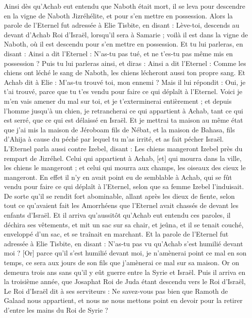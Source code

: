 \begin{multicols}{2}
Ainsi dès qu'Achab eut entendu que Naboth était mort, il se leva pour descendre en la vigne de Naboth Jizréhélite, et pour s'en mettre en possession.
Alors la parole de l'Eternel fut adressée à Elie Tisbite, en disant :
Lève-toi, descends au devant d'Achab Roi d'Israël, lorsqu'il sera à Samarie ; voilà il est dans la vigne de Naboth, où il est descendu pour s'en mettre en possession.
Et tu lui parleras, en disant : Ainsi a dit l'Eternel : N'as-tu pas tué, et ne t'es-tu pas même mis en possession ? Puis tu lui parleras ainsi, et diras : Ainsi a dit l'Eternel : Comme les chiens ont léché le sang de Naboth, les chiens lécheront aussi ton propre sang.
Et Achab dit à Elie : M'as-tu trouvé toi, mon ennemi ? Mais il lui répondit : Oui, je t'ai trouvé, parce que tu t'es vendu pour faire ce qui déplaît à l'Eternel.
Voici je m'en vais amener du mal sur toi, et je t'exterminerai entièrement ; et depuis l'homme jusqu'à un chien, je retrancherai ce qui appartient à Achab, tant ce qui est serré, que ce qui est délaissé en Israël.
Et je mettrai ta maison au même état que j'ai mis la maison de Jéroboam fils de Nébat, et la maison de Bahasa, fils d'Ahija à cause du péché par lequel tu m'as irrité, et as fait pécher Israël.
L'Eternel parla aussi contre Izebel, disant : Les chiens mangeront Izebel près du rempart de Jizréhel.
Celui qui appartient à Achab, [et] qui mourra dans la ville, les chiens le mangeront ; et celui qui mourra aux champs, les oiseaux des cieux le mangeront.
En effet il n'y en avait point eu de semblable à Achab, qui se fût vendu pour faire ce qui déplaît à l'Eternel, selon que sa femme Izebel l'induisait.
De sorte qu'il se rendit fort abominable, allant après les dieux de fiente, selon tout ce qu'avaient fait les Amorrhéens que l'Eternel avait chassés de devant les enfants d'Israël.
Et il arriva qu'aussitôt qu'Achab eut entendu ces paroles, il déchira ses vêtements, et mit un sac sur sa chair, et jeûna, et il se tenait couché, enveloppé d'un sac, et se traînait en marchant.
Et la parole de l'Eternel fut adressée à Elie Tisbite, en disant :
N'as-tu pas vu qu'Achab s'est humilié devant moi ? [Or] parce qu'il s'est humilié devant moi, je n'amènerai point ce mal en son temps, ce sera aux jours de son fils que j'amènerai ce mal sur sa maison.
\VerseOne{}Or on demeura trois ans sans qu'il y eût guerre entre la Syrie et Israël.
Puis il arriva en la troisième année, que Josaphat Roi de Juda étant descendu vers le Roi d'Israël,
Le Roi d'Israël dit à ses serviteurs : Ne savez-vous pas bien que Ramoth de Galaad nous appartient, et nous ne nous mettons point en devoir pour la retirer d'entre les mains du Roi de Syrie ?

\end{multicols}
